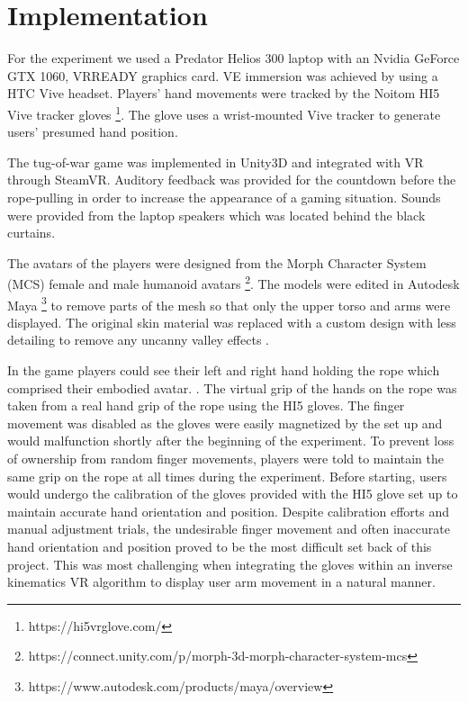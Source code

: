 
\section{Implementation}

For the experiment we used a Predator Helios 300 laptop with an Nvidia GeForce GTX 1060, VRREADY graphics card. VE immersion was achieved by using a HTC Vive headset. 
Players' hand movements were tracked by the Noitom HI5 Vive tracker gloves \footnote{https://hi5vrglove.com/}. The glove uses a wrist-mounted Vive tracker to generate users' presumed hand position. 

The tug-of-war game was implemented in Unity3D and integrated with VR through SteamVR. Auditory feedback was provided for the countdown before the rope-pulling in order to increase the appearance of a gaming situation. Sounds were provided from the laptop speakers which was located behind the black curtains.

The avatars of the players were designed from the Morph Character System (MCS) female and male humanoid avatars  \footnote{https://connect.unity.com/p/morph-3d-morph-character-system-mcs}. The models were edited in Autodesk Maya \footnote{https://www.autodesk.com/products/maya/overview} to remove parts of the mesh so that only the upper torso and arms were displayed. The original skin material was replaced with a custom design with less detailing to remove any uncanny valley effects \cite{geller2008overcoming}. 

In the game players could see their left and right hand holding the rope which comprised their embodied avatar. . The virtual grip of the hands on the rope was taken from a real hand grip of the rope using the HI5 gloves. The finger movement was disabled as the gloves were easily magnetized by the set up and would malfunction shortly after the beginning of the experiment. To prevent loss of ownership from random finger movements, players were told to maintain the same grip on the rope at all times during the experiment. Before starting, users would undergo the calibration of the gloves provided with the HI5 glove set up to maintain accurate hand orientation and position. Despite calibration efforts and manual adjustment trials, the  undesirable finger movement and often inaccurate hand orientation and position proved to be the most difficult set back of this project. This was most challenging when integrating the gloves within an inverse kinematics VR algorithm to display user arm movement in a natural manner.

